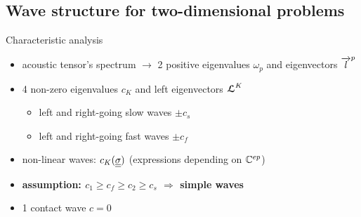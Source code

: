 
\subsection{Wave structure for two-dimensional problems}

\begin{frame}
  \begin{block}{Characteristic analysis}
    \begin{itemize}
      \item acoustic tensor's spectrum $\rightarrow$ 2 positive eigenvalues $\omega_p$ and eigenvectors ${\overrightarrow{l}}^p$
    \item 4 non-zero eigenvalues $c_K$ and left eigenvectors ${\boldsymbol{\mathcal{L}}}^K$ 
      \begin{itemize}
      \item[] left and right-going slow waves $\pm c_s$
      \item[] left and right-going fast waves $\pm c_f$
      \end{itemize}
    \item non-linear waves: $c_K({\underline{\underline{\sigma}}})$ (expressions depending on $\mathbb{C}^{ep}$)
    \item \textbf{assumption: $c_1 \geq c_f \geq c_2 \geq c_s$ $\Rightarrow$ simple waves}
    \item 1 contact wave $c=0$
    \end{itemize}
  \end{block}
\end{frame}



